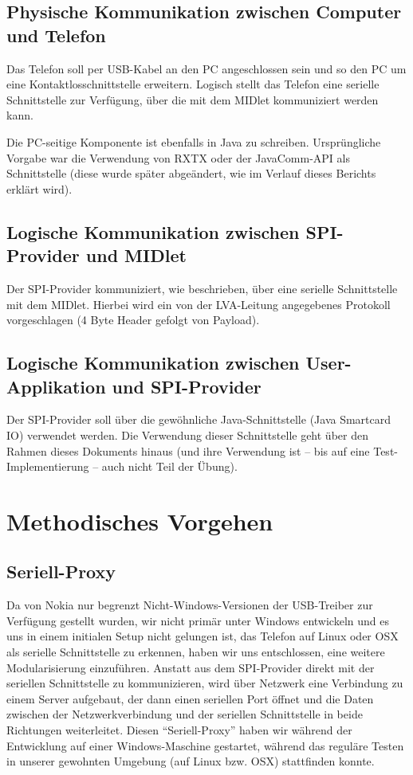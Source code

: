 \documentclass[paper=a4, fontsize=11pt]{scrartcl}
\begin{document}
\subsection{Physische Kommunikation zwischen Computer und Telefon}
Das Telefon soll per USB-Kabel an den PC angeschlossen sein und so den PC um eine Kontaktlosschnittstelle erweitern. Logisch stellt das Telefon eine serielle Schnittstelle zur Verfügung, über die mit dem MIDlet kommuniziert werden kann.

Die PC-seitige Komponente ist ebenfalls in Java zu schreiben. Ursprüngliche Vorgabe war die Verwendung von RXTX oder der JavaComm-API als Schnittstelle (diese wurde später abgeändert, wie im Verlauf dieses Berichts erklärt wird).

\subsection{Logische Kommunikation zwischen SPI-Provider und MIDlet}
Der SPI-Provider kommuniziert, wie beschrieben, über eine serielle Schnittstelle mit dem MIDlet. Hierbei wird ein von der LVA-Leitung angegebenes Protokoll vorgeschlagen (4 Byte Header gefolgt von Payload).

\subsection{Logische Kommunikation zwischen User-Applikation und SPI-Provider}
Der SPI-Provider soll über die gewöhnliche Java-Schnittstelle (Java Smartcard IO) verwendet werden. Die Verwendung dieser Schnittstelle geht über den Rahmen dieses Dokuments hinaus (und ihre Verwendung ist – bis auf eine Test-Implementierung – auch nicht Teil der Übung).


\section{Methodisches Vorgehen}
\subsection{Seriell-Proxy}
Da von Nokia nur begrenzt Nicht-Windows-Versionen der USB-Treiber zur Verfügung gestellt wurden, wir nicht primär unter Windows entwickeln und es uns in einem initialen Setup nicht gelungen ist, das Telefon auf Linux oder OSX als serielle Schnittstelle zu erkennen, haben wir uns entschlossen, eine weitere Modularisierung einzuführen. Anstatt aus dem SPI-Provider direkt mit der seriellen Schnittstelle zu kommunizieren, wird über Netzwerk eine Verbindung zu einem Server aufgebaut, der dann einen seriellen Port öffnet und die Daten zwischen der Netzwerkverbindung und der seriellen Schnittstelle in beide Richtungen weiterleitet. Diesen \enquote{Seriell-Proxy} haben wir während der Entwicklung auf einer Windows-Maschine gestartet, während das reguläre Testen in unserer gewohnten Umgebung (auf Linux bzw. OSX) stattfinden konnte.
\end{document}
